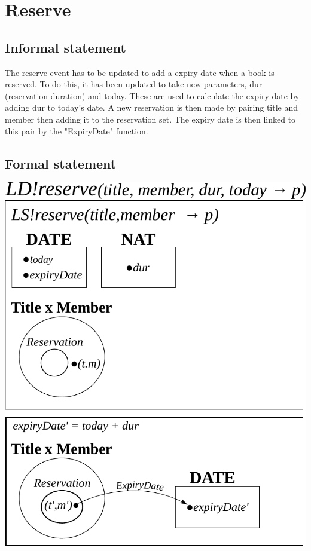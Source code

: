 \documentclass[]{article}
\begin{document}
\section{Reserve}
\subsection{Informal statement}
The reserve event has to be updated to add a expiry date when a book is reserved. To do this, it has been updated to take new parameters, dur (reservation duration) and today. These are used to calculate the expiry date by adding dur to today's date. A new reservation is then made by pairing title and member then adding it to the reservation set. The expiry date is then linked to this pair by the "ExpiryDate" function.
\subsection{Formal statement}
\begin{center}
	\includegraphics{reserve.pdf}
\end{center}
\end{document}
